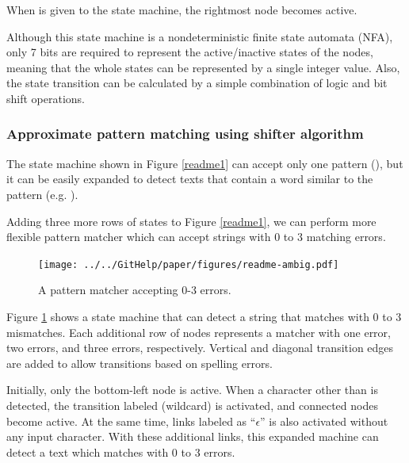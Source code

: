 \documentclass[manuscript,anonymous,review]{acmart}
\begin{document}
When  is given to the state machine,
the rightmost node becomes active.
%

Although this state machine is a nondeterministic finite state automata (NFA),
only 7 bits are required to represent the active/inactive states of the nodes,
meaning that the whole states can be represented by a single integer value.
Also,
the state transition can be calculated by a simple combination of
logic and bit shift operations.

\subsubsection{Approximate pattern matching using shifter algorithm}

The state machine shown in Figure \ref{readme1} can accept only one pattern
(), but
it can be easily expanded to detect texts that contain a word
similar to the pattern (e.g. ).


Adding three more rows of states to Figure \ref{readme1}, we can perform more
flexible pattern matcher which can accept strings with
0 to 3 matching errors.

\begin{figure}[htb]
  \centerline{\texttt{[image: ../../GitHelp/paper/figures/readme-ambig.pdf]}}
  \caption{A pattern matcher accepting 0-3 errors.}
  \label{shifterambig}
\end{figure}

Figure \ref{shifterambig} shows a state machine that can detect a string
that matches  with 0 to 3 mismatches.
Each additional row of nodes represents a matcher with one error,
two errors, and three errors, respectively.
Vertical and diagonal transition edges are added to allow
transitions based on spelling errors.

Initially, only the bottom-left node is active.
When a character other than  is detected, 
the transition labeled \sqsf{*} (wildcard) is activated,
and connected nodes become active.
At the same time, links labeled as ``$\epsilon$''
is also activated without any input character.
With these additional links, this expanded machine can detect a text which
matches  with 0 to 3 errors.
\end{document}
